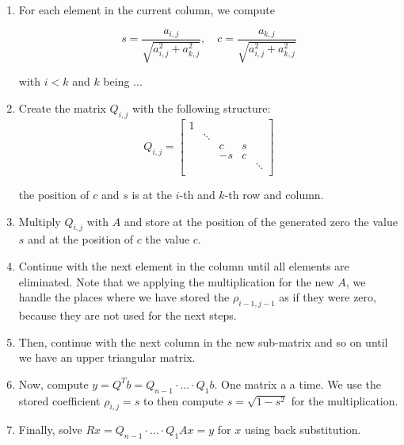 \begin{enumerate}

    \item For each element in the current column, we compute 

    \[
        s = \frac{a_{i,j}}{\sqrt{a_{i,j}^2 + a_{k,j}^2}}, \quad c = \frac{a_{k, j}}{\sqrt{a_{i,j}^2 + a_{k,j}^2}}
    \]

    with \(i < k\) and \(k\) being ... 

    \item Create the matrix \(Q_{i,j}\) with the following structure:
    \[
        Q_{i,j} = 
        \begin{bmatrix}
            1 &        &         &        &        \\
              & \ddots &         &        &        \\
              &        & c       & s      &        \\
              &        & -s      & c      &        \\
              &        &         &        & \ddots \\
        \end{bmatrix} 
    \]

    the position of \(c\) and \(s\) is at the \(i\)-th and \(k\)-th row and column.

    \item Multiply \(Q_{i,j}\) with \(A\) and store at the position of the generated zero the value \(s\) and at the position of \(c\) the value \(c\).

    \item Continue with the next element in the column until all elements are eliminated. 
    Note that we applying the multiplication for the new \(A\), we handle the places where we have stored the \(\rho_{i - 1, j - 1}\) as if they were zero, 
    because they are not used for the next steps.
    
    \item Then, continue with the next column in the new sub-matrix and so on until we have an upper triangular matrix.

    \item Now, compute \(y = Q^T b = Q_{n-1} \cdot \dots \cdot Q_1 b\). One matrix a a time. We use the stored coefficient \(\rho_{i,j} = s\) to then compute 
    \(s = \sqrt{1 - s^2}\) for the multiplication.

    \item Finally, solve \(Rx = Q_{n-1} \cdot \dots \cdot Q_1 Ax= y\) for \(x\) using back substitution.

\end{enumerate}


